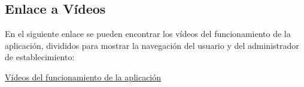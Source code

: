 \subsection{Enlace a Vídeos}

En el siguiente enlace se pueden encontrar los vídeos del funcionamiento de la aplicación, divididos para mostrar la navegación del usuario y del administrador de establecimiento:

\href{https://drive.google.com/drive/folders/17rnjypvo-kY0xWO_21fiRCe4krCTUUOR?usp=sharing}{Vídeos del funcionamiento de la aplicación}